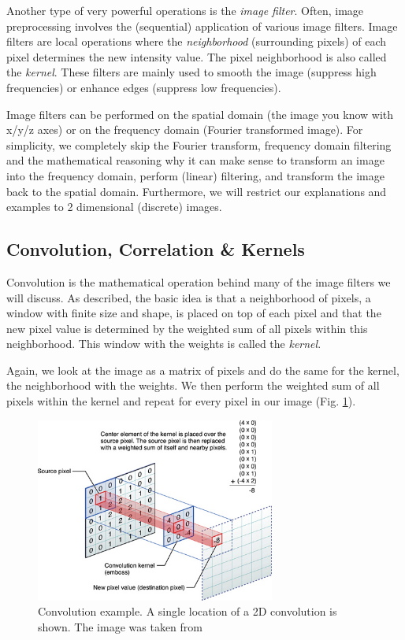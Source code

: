 Another type of very powerful operations is the \emph{image filter}. Often, image preprocessing involves the (sequential) application of various image filters. Image filters are local operations where the \emph{neighborhood} (surrounding pixels) of each pixel determines the new intensity value. The pixel neighborhood is also called the \emph{kernel}. These filters are mainly used to smooth the image (suppress high frequencies) or enhance edges (suppress low frequencies).

Image filters can be performed on the spatial domain (the image you know with x/y/z axes) or on the frequency domain (Fourier transformed image). For simplicity, we completely skip the Fourier transform, frequency domain filtering and the mathematical reasoning why it can make sense to transform an image into the frequency domain, perform (linear) filtering, and transform the image back to the spatial domain. Furthermore, we will restrict our explanations and examples to 2 dimensional (discrete) images. 

\subsection{Convolution, Correlation \& Kernels}

Convolution is the mathematical operation behind many of the image filters we will discuss. As described, the basic idea is that a neighborhood of pixels, a window with finite size and shape, is placed on top of each pixel and that the new pixel value is determined by the weighted sum of all pixels within this neighborhood. This window with the weights is called the \emph{kernel}. 

Again, we look at the image as a matrix of pixels and do the same for the kernel, the neighborhood with the weights. We then perform the weighted sum of all pixels within the kernel and repeat for every pixel in our image (Fig. \ref{fig:convolution-example}).

\begin{figure}[!ht]
	\centering
		\includegraphics[width=0.70\textwidth]{mod3/figures/convolution-example.png}
	\caption{Convolution example. A single location of a 2D convolution is shown. The image was taken from \cite{MacDev2011}}
	\label{fig:convolution-example}
\end{figure}

